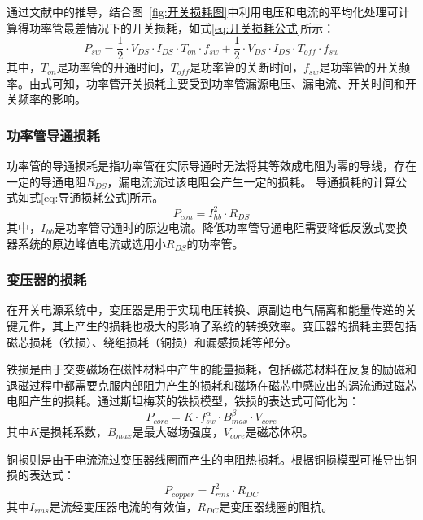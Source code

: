 通过文献\cite{zhang2016_loss,wu2016digital_loss,halder2013comprehensive_loss}中的推导，结合图~\ref{fig:开关损耗图}中利用电压和电流的平均化处理可计算得功率管最差情况下的开关损耗，如式\eqref{eq:开关损耗公式}所示：
\begin{equation}
    \label{eq:开关损耗公式}
    P_{sw}=\frac{1}{2} \cdot V_{DS} \cdot I_{DS} \cdot T_{on} \cdot f_{sw} + \frac{1}{2} \cdot V_{DS} \cdot I_{DS} \cdot T_{off} \cdot f_{sw}
\end{equation}
其中，$T_{on}$是功率管的开通时间，$T_{off}$是功率管的关断时间，$f_{sw}$是功率管的开关频率。由式可知，功率管开关损耗主要受到功率管漏源电压、漏电流、开关时间和开关频率的影响。

\subsubsection{功率管导通损耗}

功率管的导通损耗是指功率管在实际导通时无法将其等效成电阻为零的导线，存在一定的导通电阻$R_{DS}$，漏电流流过该电阻会产生一定的损耗。
导通损耗的计算公式如式\eqref{eq:导通损耗公式}所示。
\begin{equation}
    \label{eq:导通损耗公式}
    P_{con} = I_{hb}^2 \cdot R_{DS}
\end{equation}
其中，$I_{hb}$是功率管导通时的原边电流。降低功率管导通电阻需要降低反激式变换器系统的原边峰值电流或选用小$R_{DS}$的功率管。

\iffalse
\subsubsection{变压器的损耗}

在开关电源系统中，变压器是用于实现电压转换、原副边电气隔离和能量传递的关键元件，其上产生的损耗也极大的影响了系统的转换效率。变压器的损耗主要包括磁芯损耗（铁损）、绕组损耗（铜损）和漏感损耗等部分。

铁损是由于交变磁场在磁性材料中产生的能量损耗，包括磁芯材料在反复的励磁和退磁过程中都需要克服内部阻力产生的损耗和磁场在磁芯中感应出的涡流通过磁芯电阻产生的损耗。通过斯坦梅茨的铁损模型，铁损的表达式可简化为：
\begin{equation}
    \label{eq:铁损公式}
    P_{core} = K \cdot f_{sw}^\alpha  \cdot B_{max}^\beta \cdot V_{core} 
\end{equation}
其中$K$是损耗系数，$B_{max}$是最大磁场强度，$V_{core}$是磁芯体积。

铜损则是由于电流流过变压器线圈而产生的电阻热损耗。根据铜损模型可推导出铜损的表达式：
\begin{equation}
    \label{eq:铜损公式}
    P_{copper} = I_{rms}^2  \cdot R_{DC} 
\end{equation}
其中$I_{rms}$是流经变压器电流的有效值，$R_{DC}$是变压器线圈的阻抗。

